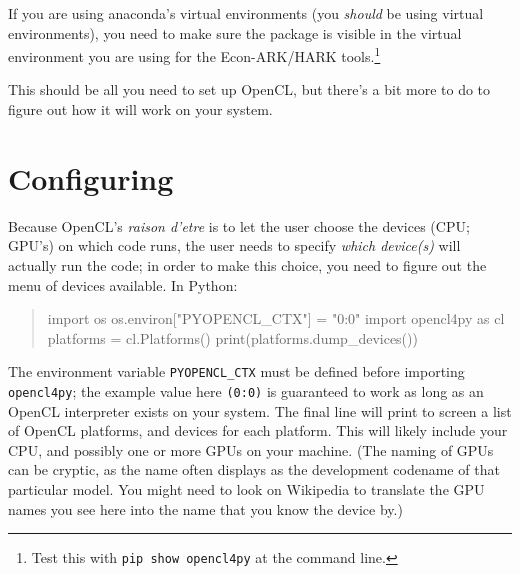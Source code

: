 \documentclass[12pt,pdftex,letterpaper]{article}
\begin{document}
If you are using anaconda's virtual environments (you {\it should} be using virtual environments), you need to make sure the package is visible in the virtual environment you are using for the Econ-ARK/HARK tools.\footnote{Test this with \texttt{pip show opencl4py} at the command line.}

This should be all you need to set up OpenCL, but there's a bit more to do to figure out how it will work on your system.

\section{Configuring \oclpy}

Because OpenCL's {\it raison d'etre} is to let the user choose the devices (CPU; GPU's) on which code runs, the user needs to specify \textit{which device(s)} will actually run the code; in order to make this choice, you need to figure out the menu of devices available.  In Python:
\begin{quote}
\begin{python}
import os
os.environ["PYOPENCL_CTX"] = "0:0"
import opencl4py as cl
platforms = cl.Platforms()
print(platforms.dump_devices())
\end{python}
\end{quote}

The environment variable \texttt{PYOPENCL\_CTX} must be defined before importing \texttt{opencl4py}; the example value here \texttt{(0:0)} is guaranteed to work as long as an OpenCL interpreter exists on your system.  The final line will print to screen a list of OpenCL platforms, and devices for each platform.  This will likely include your CPU, and possibly one or more GPUs on your machine.  (The naming of GPUs can be cryptic, as the name often displays as the development codename of that particular model.  You might need to look on Wikipedia to translate the GPU names you see here into the name that you know the device by.)
\end{document}
